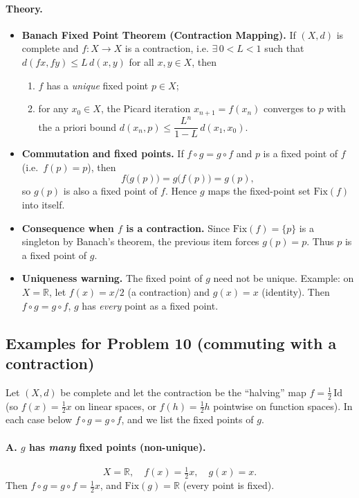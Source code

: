 \documentclass[12pt,a4paper]{article}
\theoremstyle{plain}
\theoremstyle{definition}
\theoremstyle{remark}
\theoremstyle{remark}
\begin{document}
\paragraph{Theory.}
\begin{itemize}
	\item \textbf{Banach Fixed Point Theorem (Contraction Mapping).}
	If $(X,d)$ is complete and $f:X\to X$ is a contraction, i.e.
	$\exists\,0<L<1$ such that $d(fx,fy)\le L\,d(x,y)$ for all $x,y\in X$, then
	\begin{enumerate}
		\item $f$ has a \emph{unique} fixed point $p\in X$;
		\item for any $x_0\in X$, the Picard iteration $x_{n+1}=f(x_n)$ converges to $p$ with the a priori bound
		$d(x_n,p)\le \dfrac{L^n}{1-L}\,d(x_1,x_0)$.
	\end{enumerate}
	
	\item \textbf{Commutation and fixed points.}
	If $f\circ g=g\circ f$ and $p$ is a fixed point of $f$ (i.e.\ $f(p)=p$), then
	\[
	f\big(g(p)\big)=g\big(f(p)\big)=g(p),
	\]
	so $g(p)$ is also a fixed point of $f$. Hence $g$ maps the fixed-point set $\mathrm{Fix}(f)$
	into itself.
	
	\item \textbf{Consequence when $f$ is a contraction.}
	Since $\mathrm{Fix}(f)=\{p\}$ is a singleton by Banach’s theorem, the previous item forces
	$g(p)=p$. Thus $p$ is a fixed point of $g$.
	
	\item \textbf{Uniqueness warning.}
	The fixed point of $g$ need not be unique. Example: on $X=\mathbb{R}$, let
	$f(x)=x/2$ (a contraction) and $g(x)=x$ (identity). Then $f\circ g=g\circ f$,
	$g$ has \emph{every} point as a fixed point.
\end{itemize}

\subsection*{Examples for Problem 10 (commuting with a contraction)}

Let $(X,d)$ be complete and let the contraction be the “halving” map $f=\tfrac12\,\mathrm{Id}$ (so $f(x)=\tfrac12 x$ on linear spaces, or $f(h)=\tfrac12 h$ pointwise on function spaces). In each case below $f\circ g=g\circ f$, and we list the fixed points of $g$.

\paragraph{A. $g$ has \emph{many} fixed points (non-unique).}
\[
X=\mathbb{R},\quad f(x)=\tfrac12 x,\quad g(x)=x.
\]
Then $f\circ g=g\circ f=\tfrac12 x$, and $\mathrm{Fix}(g)=\mathbb{R}$ (every point is fixed).
\end{document}
